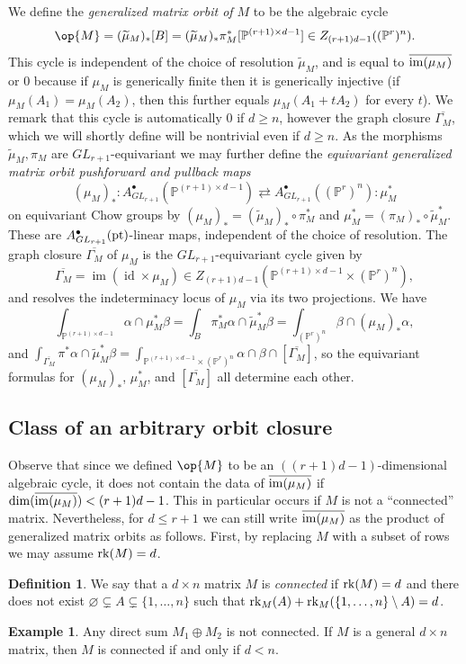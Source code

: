\documentclass[12pt]{amsart}
\newcommand{\mb}{\mathbb}
\newcommand{\im}{{\rm im}}
\newcommand{\ol}{\overline}
\newcommand{\wt}{\widetilde}
\newcommand{\pt}{{\rm pt}}
\newcommand{\rk}{{\rm rk}}
\theoremstyle{plain}
\theoremstyle{definition}
\newtheorem{Def}{Definition}[section]
\newtheorem{Exam}{Example}
\theoremstyle{remark}
\begin{document}
We define the \emph{generalized matrix orbit of $M$} to be the algebraic cycle
$$\op{M}=(\wt{\mu}_M)_*[B] = (\wt{\mu}_M)_*\pi_M^*[\mb{P}^{(r+1)\times d-1}] \in Z_{(r+1)d-1}((\mb{P}^r)^n).$$ This cycle is independent of the choice of resolution $\wt{\mu}_M$, and is equal to $\overline{\im(\mu_M)}$ or $0$ because if $\mu_M$ is generically finite then it is generically injective (if $\mu_M(A_1)=\mu_M(A_2)$, then this further equals $\mu_M(A_1+tA_2)$ for every $t$). We remark that this cycle is automatically $0$ if $d\ge n$, however the graph closure $\overline{\Gamma_M}$, which we will shortly define will be nontrivial even if $d\ge n$. As the morphisms $\wt{\mu}_M, \pi_M$ are $GL_{r+1}$-equivariant we may further define the \emph{equivariant generalized matrix orbit pushforward and pullback maps} \[(\mu_M)_*:A^\bullet_{GL_{r+1}}(\mb{P}^{(r+1)\times d-1}) \rightleftarrows A^\bullet_{GL_{r+1}}((\mb{P}^r)^n):\mu_M^*\] on equivariant Chow groups by $(\mu_M)_* =(\wt{\mu}_M)_* \circ \pi_M^*$ and $\mu_M^*=(\pi_M)_*\circ \wt{\mu}_M^*$. These are $A^\bullet_{GL_{r+1}}(\pt)$-linear maps, independent of the choice of resolution. The graph closure $\ol{\Gamma_M}$ of $\mu_M$ is the $GL_{r+1}$-equivariant cycle given by $$\ol{\Gamma_M}=\ol{\operatorname{im}(\operatorname{id} \times \mu_M)}\in Z_{(r+1)d-1}(\mb{P}^{(r+1)\times d-1}\times (\mb{P}^r)^n),$$ and resolves the indeterminacy locus of $\mu_M$ via its two projections. We have $$\int_{\mb{P}^{(r+1)\times d-1}}\alpha\cap\mu_M^*\beta=\int_{B}\pi_M^*\alpha\cap\wt{\mu}_M^*\beta=\int_{(\mb{P}^r)^n}\beta\cap(\mu_M)_*\alpha,$$ and $\int_{\ol{\Gamma_M}}\pi^*\alpha\cap\tilde{\mu}_M^*\beta=\int_{\mb{P}^{(r+1)\times d-1}\times (\mb{P}^r)^n}\alpha\cap\beta\cap[\ol{\Gamma_M}]$, so the equivariant formulas for $(\mu_M)_*$, $\mu^*_M$, and $[\ol{\Gamma_M}]$ all determine each other.

\subsection{Class of an arbitrary orbit closure}
\label{allorbits}
Observe that since we defined $\op{M}$ to be an $((r+1)d-1)$-dimensional algebraic cycle, it does not contain the data of $\ol{\im(\mu_M)}$ if $\dim (\ol{\im(\mu_M)}) < (r+1)d-1$. This in particular occurs if $M$ is not a ``connected'' matrix. Nevertheless, for $d \leq r+1$ we can still write $\ol{\im(\mu_M)}$ as the product of generalized matrix orbits as follows. First, by replacing $M$ with a subset of rows we may assume $\rk(M)=d$.

\begin{Def}
We say that a $d \times n$ matrix $M$ is \emph{connected} if $\rk(M) = d$ and there does not exist $\varnothing \subsetneq A \subsetneq \{1, \ldots, n\}$ such that $\rk_M(A) + \rk_M(\{1, \ldots, n\} \setminus A) = d$.
\end{Def}
\begin{Exam}
Any direct sum $M_1\oplus M_2$ is not connected. If $M$ is a general $d\times n$ matrix, then $M$ is connected if and only if $d<n$.
\end{Exam}
\end{document}
